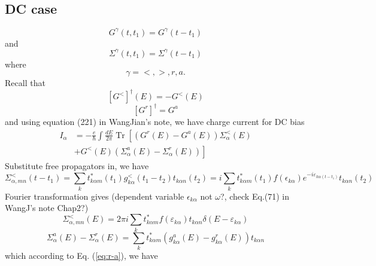 \documentclass[11pt,a4paper]{article}
\begin{document}
\subsection{DC case}
\begin{equation}
G^{\gamma}\left(t, t_{1}\right)=G^{\gamma}\left(t-t_{1}\right)
\end{equation}
and
\begin{equation}
\Sigma^{\gamma}\left(t, t_{1}\right)=\Sigma^{\gamma}\left(t-t_{1}\right)
\end{equation}
where
\begin{equation}
\gamma=<,>, r, a.
\end{equation}
Recall that
\begin{equation}
\left[G^{<}\right]^{\dagger}(E)=-G^{<}(E)
\end{equation}
\begin{equation}
\left[G^{r}\right]^{\dagger}=G^{a}
\end{equation}
and using equation (221) in WangJian's note, we have charge current for DC bias
\begin{equation}
\begin{aligned}
I_{\alpha} &=-\frac{e}{\hbar} \int \frac{d E}{2 \pi} \operatorname{Tr}\left[\left(G^{r}(E)-G^{a}(E)\right) \Sigma_{\alpha}^{<}(E)\right.\\
&\left.+G^{<}(E)\left(\Sigma_{\alpha}^{a}(E)-\Sigma_{\alpha}^{r}(E)\right)\right]
\end{aligned}
\label{eq:current1}
\end{equation}
Substitute free propagators in, we have
\begin{equation}
\Sigma_{\alpha,mn}^{<}(t-t_{1}) = \sum_{k} t_{k\alpha m}^{*}(t_{1}) g_{k\alpha}^{<}(t_{1}-t_{2}) t_{k\alpha n}(t_{2}) = i\sum_{k} t_{k\alpha m}^{*}(t_{1}) f(\epsilon_{k\alpha})e^{-i\varepsilon_{k\alpha(t-t_{1})}}t_{k\alpha n}(t_{2})
\end{equation}
Fourier transformation gives (dependent variable $\epsilon_{k\alpha}$ not $\omega$?, check Eq.(71) in WangJ's note Chap2?)
\begin{equation}
\Sigma_{\alpha,mn}^{<}(E) = 2\pi i\sum_{k}t_{k\alpha m}^{*}f(\varepsilon_{k\alpha})t_{k\alpha n} \delta(E-\varepsilon_{k\alpha})
\end{equation}
\begin{equation}
\Sigma_{\alpha}^{a}(E)-\Sigma_{\alpha}^{r}(E) = \sum_{k}t_{k\alpha m}^{*}(g_{k\alpha}^{a}(E)-g_{k\alpha}^{r}(E))t_{k\alpha n}
\end{equation}
which according to Eq. (\ref{eq:r-a}), we have
\end{document}
